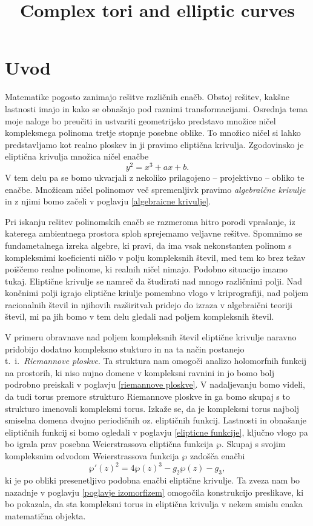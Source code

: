 \documentclass[mat1]{fmfdelo}
\title{Complex tori and elliptic curves}
\numberwithin{equation}{section}
\theoremstyle{definition}
\begin{document}
\pagecolor{material-theme}
\color{white}


\section{Uvod}

Matematike pogosto zanimajo rešitve različnih enačb. Obstoj rešitev, kakšne lastnosti imajo in
kako se obnašajo pod raznimi transformacijami. Osrednja tema moje naloge bo preučiti in ustvariti
geometrijsko predstavo množice ničel kompleksnega polinoma tretje stopnje posebne oblike. 
To množico ničel si lahko predstavljamo kot realno ploskev in ji pravimo eliptična krivulja.   
Zgodovinsko je eliptična krivulja množica ničel enačbe
\[
    y^2 = x^3 + ax + b. 
\]
V tem delu pa se bomo ukvarjali z nekoliko prilagojeno -- projektivno -- obliko te enačbe. Množicam ničel
polinomov več spremenljivk pravimo \emph{algebraične krivulje} in z njimi bomo začeli v poglavju \ref{algebraicne krivulje}. 
\par 
Pri iskanju rešitev
polinomskih enačb se razmeroma hitro porodi vprašanje, iz katerega ambientnega prostora 
sploh sprejemamo veljavne rešitve. Spomnimo se fundametalnega izreka algebre, ki pravi, da ima
vsak nekonstanten polinom s kompleksnimi koeficienti ničlo v polju kompleksnih števil, med tem
ko brez težav poiščemo realne polinome, ki realnih ničel nimajo. Podobno situacijo imamo tukaj. 
Eliptične krivulje se namreč da študirati nad mnogo različnimi polji. Nad končnimi polji igrajo
eliptične kriulje pomembno vlogo v kriprografiji, nad poljem racionalnih števil in njihovih razširitvah pridejo do izraza v algebraični teoriji
števil, mi pa jih bomo v tem delu gledali nad poljem kompleksnih števil. 
\par
V primeru obravnave nad poljem kompleksnih števil eliptične
krivulje naravno pridobijo dodatno kompleksno stukturo in na ta način postanejo t.~i.\ \emph{Riemannove ploskve}. Ta struktura nam omogoči analizo holomorfnih funkcij na prostorih, ki niso nujno domene v kompleksni ravnini in jo
bomo bolj podrobno preiskali v poglavju \ref{riemannove ploskve}. V nadaljevanju bomo videli, da tudi torus premore strukturo Riemannove ploskve in ga bomo skupaj s to strukturo imenovali kompleksni torus. Izkaže se, da je kompleksni
torus najbolj smiselna domena dvojno periodičnih oz. eliptičnih funkcij. Lastnosti in obnašanje eliptičnih funkcij si bomo ogledali v poglavju \ref{elipticne funkcije}, ključno vlogo pa bo igrala prav posebna Weierstrassova eliptična funkcija $\wp$. Skupaj s svojim kompleksnim odvodom Weierstrassova funkcija $\wp$ zadošča enačbi
\[
  \wp'(z)^2 = 4\wp(z)^3 - g_2\wp(z) - g_3,  
\] 
ki je po obliki presenetljivo podobna enačbi eliptične krivulje.
Ta zveza nam bo nazadnje v poglavju \ref{poglavje izomorfizem} omogočila konstrukcijo preslikave, ki bo pokazala, da sta kompleksni torus in eliptična krivulja v nekem smislu enaka matematična objekta.
\end{document}
